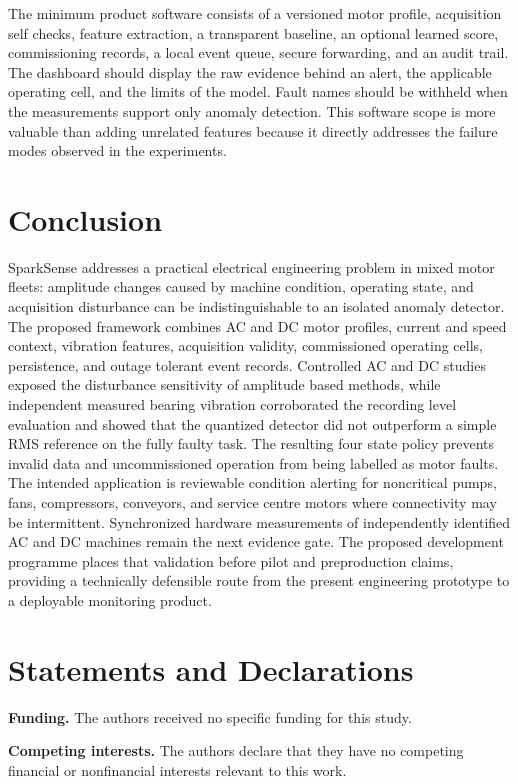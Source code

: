\documentclass[10pt,twocolumn]{article}
\begin{document}
The minimum product software consists of a versioned motor profile, acquisition self checks, feature extraction, a transparent baseline, an optional learned score, commissioning records, a local event queue, secure forwarding, and an audit trail. The dashboard should display the raw evidence behind an alert, the applicable operating cell, and the limits of the model. Fault names should be withheld when the measurements support only anomaly detection. This software scope is more valuable than adding unrelated features because it directly addresses the failure modes observed in the experiments.

\section{Conclusion}
SparkSense addresses a practical electrical engineering problem in mixed motor fleets: amplitude changes caused by machine condition, operating state, and acquisition disturbance can be indistinguishable to an isolated anomaly detector. The proposed framework combines AC and DC motor profiles, current and speed context, vibration features, acquisition validity, commissioned operating cells, persistence, and outage tolerant event records. Controlled AC and DC studies exposed the disturbance sensitivity of amplitude based methods, while independent measured bearing vibration corroborated the recording level evaluation and showed that the quantized detector did not outperform a simple RMS reference on the fully faulty task. The resulting four state policy prevents invalid data and uncommissioned operation from being labelled as motor faults. The intended application is reviewable condition alerting for noncritical pumps, fans, compressors, conveyors, and service centre motors where connectivity may be intermittent. Synchronized hardware measurements of independently identified AC and DC machines remain the next evidence gate. The proposed development programme places that validation before pilot and preproduction claims, providing a technically defensible route from the present engineering prototype to a deployable monitoring product.

\balance

\section*{Statements and Declarations}
\textbf{Funding.} The authors received no specific funding for this study.

\textbf{Competing interests.} The authors declare that they have no competing financial or nonfinancial interests relevant to this work.
\end{document}
